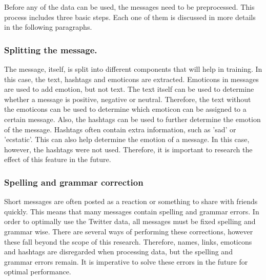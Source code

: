 
Before any of the data can be used, the messages need to be preprocessed. This process includes three basic steps. Each one of them is discussed in more details in the following paragraphs.

\subsubsection*{Splitting the message.}
The message, itself, is split into different components that will help in training. In this case, the text, hashtags and emoticons are extracted. Emoticons in messages are used to add emotion, but not text. The text itself can be used to determine whether a message is positive, negative or neutral. Therefore, the text without the emoticons can be used to determine which emoticon can be assigned to a certain message. Also, the hashtags can be used to further determine the emotion of the message. Hashtags often contain extra information, such as 'sad' or 'ecstatic'. This can also help determine the emotion of a message. In this case, however, the hashtags were not used. Therefore, it is important to research the effect of this feature in the future. 

\subsubsection*{Spelling and grammar correction}
Short messages are often posted as a reaction or something to share with friends quickly. This means that many messages contain spelling and grammar errors. In order to optimally use the Twitter data, all messages must be fixed spelling and grammar wise. There are several ways of performing these corrections, however these fall beyond the scope of this research. Therefore, names, links, emoticons and hashtags are disregarded when processing data, but the spelling and grammar errors remain. It is imperative to solve these errors in the future for optimal performance.


